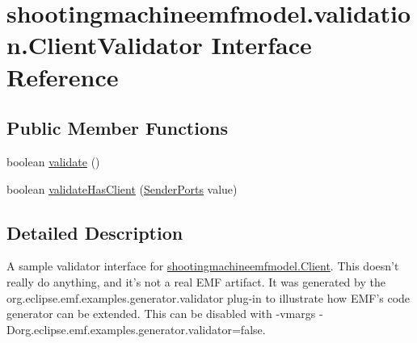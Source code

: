 \hypertarget{interfaceshootingmachineemfmodel_1_1validation_1_1_client_validator}{\section{shootingmachineemfmodel.\-validation.\-Client\-Validator Interface Reference}
\label{interfaceshootingmachineemfmodel_1_1validation_1_1_client_validator}
}
\subsection*{Public Member Functions}
\begin{DoxyCompactItemize}
\item 
boolean \hyperlink{interfaceshootingmachineemfmodel_1_1validation_1_1_client_validator_a4c07ba51240974622a67f359cce41cd3}{validate} ()
\item 
boolean \hyperlink{interfaceshootingmachineemfmodel_1_1validation_1_1_client_validator_a91fe02c6581920ba924d223d7195c840}{validate\-Has\-Client} (\hyperlink{interfaceshootingmachineemfmodel_1_1_sender_ports}{Sender\-Ports} value)
\end{DoxyCompactItemize}


\subsection{Detailed Description}
A sample validator interface for \hyperlink{interfaceshootingmachineemfmodel_1_1_client}{shootingmachineemfmodel.\-Client}. This doesn't really do anything, and it's not a real E\-M\-F artifact. It was generated by the org.\-eclipse.\-emf.\-examples.\-generator.\-validator plug-\/in to illustrate how E\-M\-F's code generator can be extended. This can be disabled with -\/vmargs -\/\-Dorg.\-eclipse.\-emf.\-examples.\-generator.\-validator=false. 

